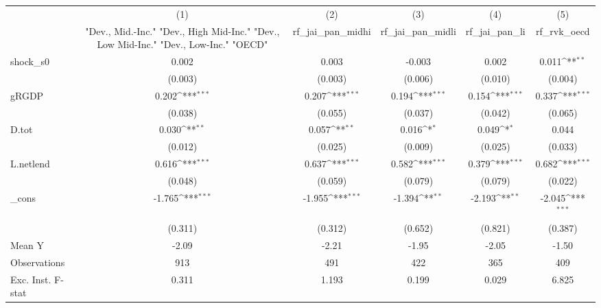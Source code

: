 {
\def\sym#1{\ifmmode^{#1}\else\(^{#1}\)\fi}
\begin{tabular}{l*{5}{c}}
\toprule
            &\multicolumn{1}{c}{(1)}&\multicolumn{1}{c}{(2)}&\multicolumn{1}{c}{(3)}&\multicolumn{1}{c}{(4)}&\multicolumn{1}{c}{(5)}\\
            &\multicolumn{1}{c}{ "Dev., Mid.-Inc." "Dev., High Mid-Inc." "Dev., Low Mid-Inc." "Dev., Low-Inc." "OECD" }&\multicolumn{1}{c}{rf\_jai\_pan\_midhi}&\multicolumn{1}{c}{rf\_jai\_pan\_midli}&\multicolumn{1}{c}{rf\_jai\_pan\_li}&\multicolumn{1}{c}{rf\_rvk\_oecd}\\
\midrule
shock\_s0    &       0.002         &       0.003         &      -0.003         &       0.002         &       0.011\sym{**} \\
            &     (0.003)         &     (0.003)         &     (0.006)         &     (0.010)         &     (0.004)         \\
\addlinespace
gRGDP       &       0.202\sym{***}&       0.207\sym{***}&       0.194\sym{***}&       0.154\sym{***}&       0.337\sym{***}\\
            &     (0.038)         &     (0.055)         &     (0.037)         &     (0.042)         &     (0.065)         \\
\addlinespace
D.tot       &       0.030\sym{**} &       0.057\sym{**} &       0.016\sym{*}  &       0.049\sym{*}  &       0.044         \\
            &     (0.012)         &     (0.025)         &     (0.009)         &     (0.025)         &     (0.033)         \\
\addlinespace
L.netlend   &       0.616\sym{***}&       0.637\sym{***}&       0.582\sym{***}&       0.379\sym{***}&       0.682\sym{***}\\
            &     (0.048)         &     (0.059)         &     (0.079)         &     (0.079)         &     (0.022)         \\
\addlinespace
\_cons      &      -1.765\sym{***}&      -1.955\sym{***}&      -1.394\sym{**} &      -2.193\sym{**} &      -2.045\sym{***}\\
            &     (0.311)         &     (0.312)         &     (0.652)         &     (0.821)         &     (0.387)         \\
\midrule
Mean Y      &       -2.09         &       -2.21         &       -1.95         &       -2.05         &       -1.50         \\
Observations&         913         &         491         &         422         &         365         &         409         \\
Exc. Inst. F-stat&       0.311         &       1.193         &       0.199         &       0.029         &       6.825         \\
\bottomrule
\end{tabular}
}
